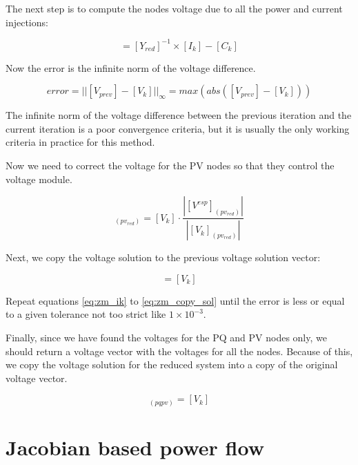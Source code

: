 \documentclass[nols,a4paper,twoside,symmetric,notoc,fleqn]{tufte-book}
\begin{document}
The next step is to compute the nodes voltage due to all the power and current injections:

\begin{equation}
[V_k] = [Y_{red}]^{-1} \times [I_k] - [C_k]
\end{equation}


Now the error is the infinite norm of the voltage difference.

\begin{equation}
error = ||[V_{prev}] - [V_k] ||_{\infty} = max(abs([V_{prev}] - [V_k] ))
\end{equation}

The infinite norm of the voltage difference between the previous iteration and the current iteration is a poor convergence criteria, but it is usually the only working criteria in practice for this method.

Now we need to correct the voltage for the PV nodes so that they control the voltage module.

\begin{equation}
[V_k]_{ (pv_{red})} = [V_k] \cdot \frac{|[V^{esp}]_{(pv_{red})}|}{|[V_k]_{(pv_{red})}|}
\label{eq:zm_pv_correction}
\end{equation}


Next, we copy the voltage solution to the previous voltage solution vector:

\begin{equation}
[V_{prev}] = [V_k]
\label{eq:zm_copy_sol}
\end{equation}

Repeat equations \ref{eq:zm_ik} to \ref{eq:zm_copy_sol} until the error is less or equal to a given tolerance not too strict like $1\times10^{-3}$.

Finally, since we have found the voltages for the PQ and PV nodes only, we should return a voltage vector with the voltages for all the nodes. Because of this, we copy the voltage solution for the reduced system into a copy of the original voltage vector.

\begin{equation}
[V]_{(pqpv)} = [V_k]
\end{equation}


\section{Jacobian based power flow}
\end{document}
